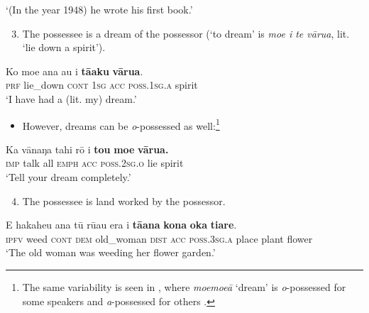 \glt
‘(In the year 1948) he wrote his first book.’ \textstyleExampleref{[R539-1.080]}
\z

\begin{enumerate}
\setcounter{enumi}{2}
\item 
The possessee is a dream of the possessor (‘to dream’ is \textit{moe i te vārua}, lit. ‘lie down a spirit’).

\end{enumerate}

\ea\label{ex:6.73}
\gll Ko moe {\ꞌ}ana au i \textbf{tā{\ꞌ}aku} \textbf{vārua}. \\
\textsc{prf} lie\_down \textsc{cont} \textsc{1sg} \textsc{acc} \textsc{poss.1sg.a} spirit \\

\glt
‘I have had a (lit. my) dream.’ \textstyleExampleref{[R167.045]} 
\z

\begin{itemize}
\item[]
However, dreams can be \textit{o}{}-possessed as well:\footnote{\label{fn:299}The same variability is seen in , where \textit{moemoe}\textit{ā} ‘dream’ is \textit{o}{}-possessed for some speakers and \textit{a}{}-possessed for others \citep[170]{Harlow2007Maori}.}
\end{itemize}

\ea\label{ex:6.74}
\gll Ka vānaŋa tahi rō i \textbf{to{\ꞌ}u} \textbf{moe} \textbf{vārua.}\\
\textsc{imp} talk all \textsc{emph} \textsc{acc} \textsc{poss.2sg.o} lie spirit\\

\glt
‘Tell your dream completely.’ \textstyleExampleref{[R105.075]} 
\z

\begin{enumerate}
\setcounter{enumi}{3}
\item 
The possessee is land worked by the possessor.

\end{enumerate}

\ea\label{ex:6.75}
\gll E hakaheu {\ꞌ}ana tū rū{\ꞌ}au era i \textbf{tā{\ꞌ}ana} \textbf{kona} \textbf{{\ꞌ}oka} \textbf{tiare}. \\
\textsc{ipfv} weed \textsc{cont} \textsc{dem} old\_woman \textsc{dist} \textsc{acc} \textsc{poss.3sg.a} place plant flower \\

\glt
‘The old woman was weeding her flower garden.’ \textstyleExampleref{[R301.103]} 
\z

